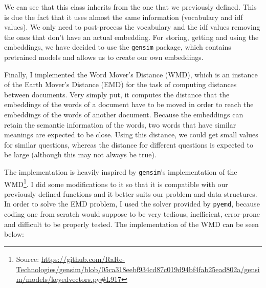 \documentclass[11pt,a4paper]{article}
\begin{document}
We can see that this class inherits from the one that we previously defined. This
is due the fact that it uses almost the same information (vocabulary and idf values).
We only need to post-process the vocabulary and the idf values removing the ones
that don't have an actual embedding. For storing, getting and using the embeddings,
we have decided to use the \texttt{gensim} package, which contains pretrained models
and allows us to create our own embeddings.

Finally, I implemented the Word Mover's Distance (WMD)\cite{pmlr-v37-kusnerb15},
which is an instance of the Earth Mover's Distance (EMD) for the task of computing
distances between documents. Very simply put, it computes the distance that the
embeddings of the words of a document have to be moved in order to reach the embeddings
of the words of another document. Because the embeddings can retain the semantic
information of the words, two words that have similar meanings are expected to be
close. Using this distance, we could get small values for similar questions,
whereas the distance for different questions is expected to be large (although
this may not always be true).

The implementation is heavily inspired by \texttt{gensim}'s implementation of the
WMD\footnote{Source: \url{https://github.com/RaRe-Technologies/gensim/blob/05ca318eebf934cd87c019d94bf4fab25ead802a/gensim/models/keyedvectors.py\#L917}}.
I did some modifications to it so that it is compatible with our previously defined
functions and it better suits our problem and data structures. In order
to solve the EMD problem, I used the solver provided by \texttt{pyemd}, because
coding one from scratch would suppose to be very tedious, inefficient, error-prone
and difficult to be properly tested. The implementation of the WMD can be seen below:
\end{document}

